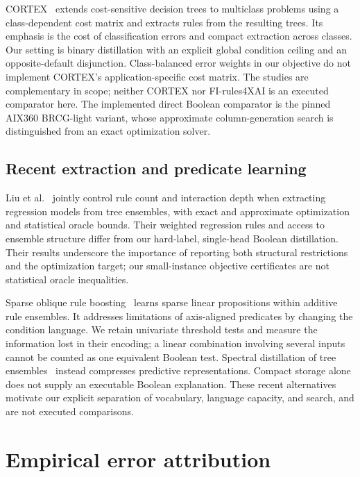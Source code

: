 \documentclass[review,12pt]{elsarticle}
\begin{document}
CORTEX~\citep{kopanja2025} extends cost-sensitive decision trees to multiclass problems using a class-dependent cost matrix and extracts rules from the resulting trees. Its emphasis is the cost of classification errors and compact extraction across classes. Our setting is binary distillation with an explicit global condition ceiling and an opposite-default disjunction. Class-balanced error weights in our objective do not implement CORTEX's application-specific cost matrix. The studies are complementary in scope; neither CORTEX nor FI-rules4XAI is an executed comparator here. The implemented direct Boolean comparator is the pinned AIX360 BRCG-light variant, whose approximate column-generation search is distinguished from an exact optimization solver.

\subsection{Recent extraction and predicate learning}
Liu et al.~\citep{liu2026extraction} jointly control rule count and interaction depth when extracting regression models from tree ensembles, with exact and approximate optimization and statistical oracle bounds. Their weighted regression rules and access to ensemble structure differ from our hard-label, single-head Boolean distillation. Their results underscore the importance of reporting both structural restrictions and the optimization target; our small-instance objective certificates are not statistical oracle inequalities.

Sparse oblique rule boosting~\citep{behzadimanesh2026} learns sparse linear propositions within additive rule ensembles. It addresses limitations of axis-aligned predicates by changing the condition language. We retain univariate threshold tests and measure the information lost in their encoding; a linear combination involving several inputs cannot be counted as one equivalent Boolean test. Spectral distillation of tree ensembles~\citep{vu2026} instead compresses predictive representations. Compact storage alone does not supply an executable Boolean explanation. These recent alternatives motivate our explicit separation of vocabulary, language capacity, and search, and are not executed comparisons.

\section{Empirical error attribution}\label{sec:diagnostics}
\end{document}
